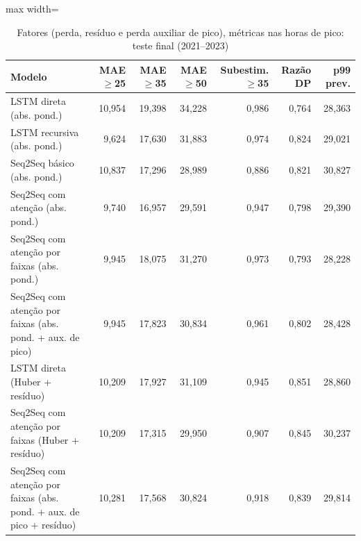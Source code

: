 \begin{table}[!htbp]
    \centering
    \caption{Fatores (perda, resíduo e perda auxiliar de pico), métricas nas horas de pico: teste final (2021--2023)}
    \label{tab:cauda_fatores_holdout}
    \small
    \begin{adjustbox}{max width=\textwidth}
    \begin{tabular}{>{\raggedright\arraybackslash}p{}rrrrrr}
        \toprule
        Modelo & MAE $\geq$25 & MAE $\geq$35 & MAE $\geq$50 & Subestim. $\geq$35 & Razão DP & p99 prev. \\
        \midrule
        LSTM direta (abs. pond.) & 10,954 & 19,398 & 34,228 & 0,986 & 0,764 & 28,363 \\
        LSTM recursiva (abs. pond.) & 9,624 & 17,630 & 31,883 & 0,974 & 0,824 & 29,021 \\
        Seq2Seq básico (abs. pond.) & 10,837 & 17,296 & 28,989 & 0,886 & 0,821 & 30,827 \\
        Seq2Seq com atenção (abs. pond.) & 9,740 & 16,957 & 29,591 & 0,947 & 0,798 & 29,390 \\
        Seq2Seq com atenção por faixas (abs. pond.) & 9,945 & 18,075 & 31,270 & 0,973 & 0,793 & 28,228 \\
        Seq2Seq com atenção por faixas (abs. pond. + aux. de pico) & 9,945 & 17,823 & 30,834 & 0,961 & 0,802 & 28,428 \\
        LSTM direta (Huber + resíduo) & 10,209 & 17,927 & 31,109 & 0,945 & 0,851 & 28,860 \\
        Seq2Seq com atenção por faixas (Huber + resíduo) & 10,209 & 17,315 & 29,950 & 0,907 & 0,845 & 30,237 \\
        Seq2Seq com atenção por faixas (abs. pond. + aux. de pico + resíduo) & 10,281 & 17,568 & 30,824 & 0,918 & 0,839 & 29,814 \\
        \bottomrule
    \end{tabular}
    \end{adjustbox}
\end{table}
